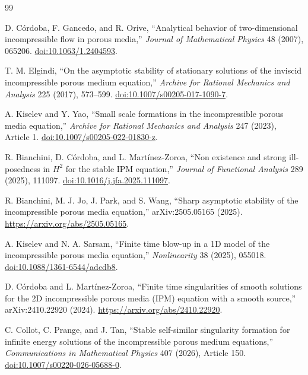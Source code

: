 \documentclass[11pt,a4paper,fontset=fandol]{ctexart}
\begin{document}
\begin{thebibliography}{99}

D. C\'ordoba, F. Gancedo, and R. Orive,
``Analytical behavior of two-dimensional incompressible flow in porous media,''
\emph{Journal of Mathematical Physics} 48 (2007), 065206.
\href{https://doi.org/10.1063/1.2404593}{doi:10.1063/1.2404593}.

T. M. Elgindi,
``On the asymptotic stability of stationary solutions of the inviscid
incompressible porous medium equation,''
\emph{Archive for Rational Mechanics and Analysis} 225 (2017), 573--599.
\href{https://doi.org/10.1007/s00205-017-1090-7}{doi:10.1007/s00205-017-1090-7}.

A. Kiselev and Y. Yao,
``Small scale formations in the incompressible porous media equation,''
\emph{Archive for Rational Mechanics and Analysis} 247 (2023), Article 1.
\href{https://doi.org/10.1007/s00205-022-01830-z}{doi:10.1007/s00205-022-01830-z}.

R. Bianchini, D. C\'ordoba, and L. Mart\'inez-Zoroa,
``Non existence and strong ill-posedness in $H^2$ for the stable IPM equation,''
\emph{Journal of Functional Analysis} 289 (2025), 111097.
\href{https://doi.org/10.1016/j.jfa.2025.111097}{doi:10.1016/j.jfa.2025.111097}.

R. Bianchini, M. J. Jo, J. Park, and S. Wang,
``Sharp asymptotic stability of the incompressible porous media equation,''
arXiv:2505.05165 (2025).
\url{https://arxiv.org/abs/2505.05165}.

A. Kiselev and N. A. Sarsam,
``Finite time blow-up in a 1D model of the incompressible porous media equation,''
\emph{Nonlinearity} 38 (2025), 055018.
\href{https://doi.org/10.1088/1361-6544/adcdb8}{doi:10.1088/1361-6544/adcdb8}.

D. C\'ordoba and L. Mart\'inez-Zoroa,
``Finite time singularities of smooth solutions for the 2D incompressible
porous media (IPM) equation with a smooth source,'' arXiv:2410.22920 (2024).
\url{https://arxiv.org/abs/2410.22920}.

C. Collot, C. Prange, and J. Tan,
``Stable self-similar singularity formation for infinite energy solutions of
the incompressible porous medium equations,''
\emph{Communications in Mathematical Physics} 407 (2026), Article 150.
\href{https://doi.org/10.1007/s00220-026-05688-0}{doi:10.1007/s00220-026-05688-0}.


\end{thebibliography}
\end{document}
